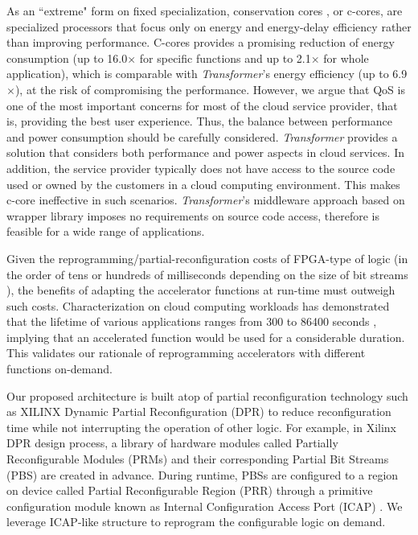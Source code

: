 As an ``extreme" form on fixed specialization, conservation cores
\cite{Venkatesh:2010:CCR:1735970.1736044,Venkatesh:2010:CCR:1736020.1736044,Venkatesh:2010:CCR:1735971.1736044},
or c-cores, are specialized processors that focus only on energy and
energy-delay efficiency rather than improving performance. C-cores
provides a promising reduction of energy consumption (up to
16.0$\times$ for specific functions and up to 2.1$\times$ for whole
application), which is comparable with {\em Transformer}'s energy
efficiency (up to 6.9$\times$), at the risk of compromising the
performance. However, we argue that QoS is one of the most important
concerns for most of the cloud service provider, that is, providing
the best user experience. Thus, the balance between performance and
power consumption should be carefully considered. {\em Transformer}
provides a solution that considers both performance and power aspects
in cloud services. In addition, the service provider typically does
not have access to the source code used or owned by the customers in a
cloud computing environment. This makes c-core ineffective in such scenarios. {\em Transformer}'s middleware approach based on wrapper library imposes no requirements on source code access, therefore is feasible for a wide range of applications. 

Given the reprogramming/partial-reconfiguration costs of FPGA-type of
logic (in the order of tens or hundreds of milliseconds depending on
the size of bit streams \cite{Liu:2009ie}), the benefits of adapting
the accelerator functions at run-time must outweigh such
costs. Characterization on cloud computing workloads has demonstrated that the lifetime of various
applications ranges from 300 to 86400 seconds \cite{CloudWorkload}, implying that an
accelerated function would be used for a considerable duration. This
validates our rationale of reprogramming accelerators with different
functions on-demand.

Our proposed architecture is built atop of partial reconfiguration
technology such as XILINX Dynamic Partial Reconfiguration (DPR)
\cite{PRUserGuide} to reduce reconfiguration time while not
interrupting the operation of other logic. For example, in Xilinx DPR
design process, a library of hardware modules called Partially
Reconfigurable Modules (PRMs) and their corresponding Partial Bit
Streams (PBS) are created in advance. 
During runtime, PBSs are configured to a region on device called
Partial Reconfigurable Region (PRR) through a primitive configuration
module known as Internal Configuration Access Port (ICAP)
\cite{Hansen:2011dt,Liu:2009ie,McDonald:2008ec}. We leverage ICAP-like
structure to reprogram the configurable logic on demand.



